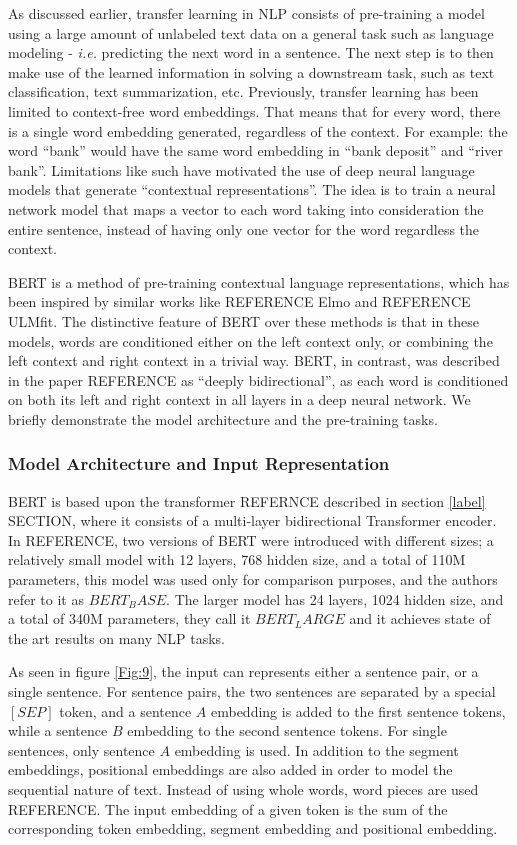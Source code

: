 As discussed earlier, transfer learning in \ac{NLP} consists of pre-training a model using a large amount of unlabeled text data on a general task such as language modeling - \textit{i.e.} predicting the next word in a sentence. The next step is to then make use of the learned information in solving a downstream task, such as text classification, text summarization, etc. Previously, transfer learning has been limited to context-free word embeddings. That means that for every word, there is a single word embedding generated, regardless of the context. For example: the word \enquote{bank} would have the same word embedding in \enquote{bank deposit} and \enquote{river bank}. Limitations like such have motivated the use of deep neural language models that generate \enquote{contextual representations}. The idea is to train a neural network model that maps a vector to each word taking into consideration the entire sentence, instead of having only one vector for the word regardless the context.

\ac{BERT} is a method of pre-training contextual language representations, which has been inspired by similar works like REFERENCE Elmo and REFERENCE ULMfit. The distinctive feature of \ac{BERT} over these methods is that in these models, words are conditioned either on the left context only, or combining the left context and right context in a trivial way. \ac{BERT}, in contrast, was described in the paper REFERENCE as \enquote{deeply bidirectional}, as each word is conditioned on both its left and right context in all layers in a deep neural network. We briefly demonstrate the model architecture and the pre-training tasks.

\subsubsection{Model Architecture and Input Representation}
\ac{BERT} is based upon the transformer REFERNCE described in section \ref{label} SECTION, where it consists of a multi-layer bidirectional Transformer encoder. In REFERENCE, two versions of \ac{BERT} were introduced with different sizes; a relatively small model with 12 layers, 768 hidden size, and a total of 110M parameters, this model was used only for comparison purposes, and the authors refer to it as $BERT_BASE$. The larger model has 24 layers, 1024 hidden size, and a total of 340M parameters, they call it $BERT_LARGE$ and it achieves state of the art results on many \ac{NLP} tasks.

As seen in figure \ref{Fig:9}, the input can represents either a sentence pair, or a single sentence. For sentence pairs, the two sentences are separated by a special $[SEP]$ token, and a sentence $A$ embedding is added to the first sentence tokens, while a sentence $B$ embedding to the second sentence tokens. For single sentences, only sentence $A$ embedding is used. In addition to the segment embeddings, positional embeddings are also added in order to model the sequential nature of text. Instead of using whole words, word pieces are used REFERENCE. The input embedding of a given token is the sum of the corresponding token embedding, segment embedding and positional embedding. 


